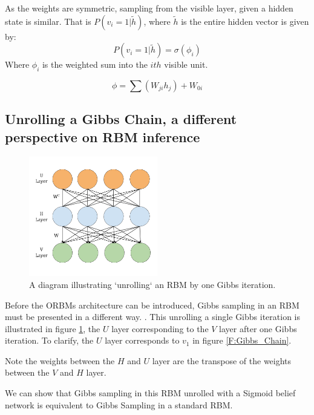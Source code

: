 As the weights are symmetric, sampling from the visible layer, given a hidden state is similar. That is $P(v_i = 1 | \tilde{h})$, where $\tilde{h}$ is the entire hidden vector is given by:
$$ P(v_i = 1 | \tilde{h}) = \sigma(\phi_{i}) $$
Where $\phi_i$ is the weighted sum into the $ith$ visible unit.

$$ \phi = \sum(W_{ji}h_{j}) + W_{0i} $$


\subsection{Unrolling a Gibbs Chain, a different perspective on RBM inference}

\begin{figure}
  \begin{center}
    \includegraphics[width=0.5\textwidth]{Assets/3_Layer_RBM.png}
  \end{center}
  \caption{A diagram illustrating `unrolling` an RBM by one Gibbs iteration.}
  \label{F:3-Layer-RBM}
\end{figure}

Before the ORBMs architecture can be introduced, Gibbs sampling in an RBM must be presented in a different way. . This unrolling a single Gibbs iteration is illustrated in figure \ref{F:3-Layer-RBM}, the $U$ layer corresponding to the $V$ layer after one Gibbs iteration. To clarify, the $U$ layer corresponds to $v_1$ in figure \ref{F:Gibbs_Chain}.

Note the weights between the $H$ and $U$ layer are the transpose of the weights between the $V$ and $H$ layer.



We can show that Gibbs sampling in this RBM unrolled with a Sigmoid belief network is equivalent to Gibbs Sampling in a standard RBM.



